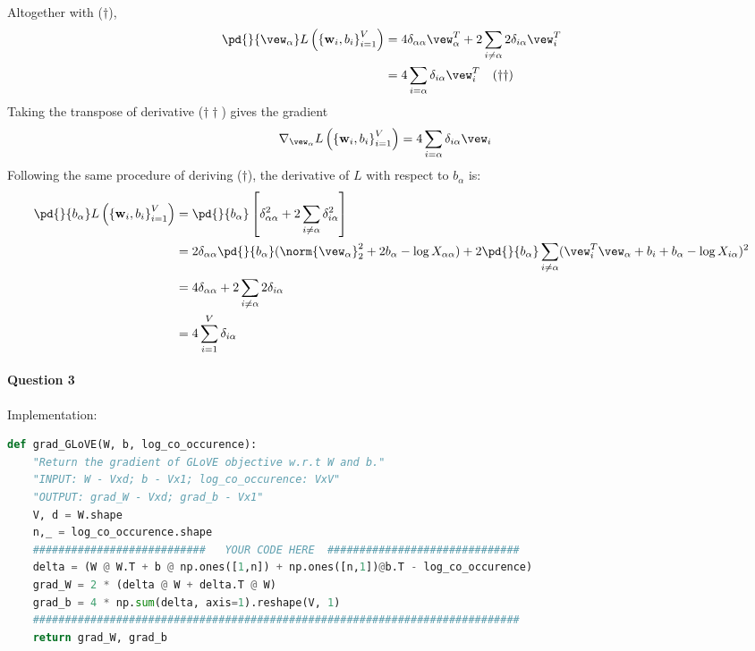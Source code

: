 \documentclass{article}
\begin{document}
    Altogether with ($\dagger$),
    \begin{align}
    	\pd{}{\vew_\alpha} L\left(\left\{\mathbf{w}_{i}, b_{i}\right\}_{i=1}^{V}\right)
    	&= 4 \delta_{\alpha \alpha} \vew_\alpha^T + 2 \sum_{i \neq \alpha} 2 \delta_{i \alpha} \vew_i^T \\
    	&= 4 \sum_{i=\alpha} \delta_{i\alpha} \vew_i^T \quad(\dagger \dagger)
    \end{align}
    Taking the transpose of derivative ($\dagger\dagger$) gives the gradient
    \begin{align}
    	\nabla_{\vew_\alpha} L\left(\left\{\mathbf{w}_{i}, b_{i}\right\}_{i=1}^{V}\right)
    	&= 4 \sum_{i=\alpha} \delta_{i\alpha} \vew_i
    \end{align}
    Following the same procedure of deriving ($\dagger$), the derivative of $L$ with respect to $b_\alpha$ is:
    \begin{align}
    	\pd{}{b_\alpha} L\left(\left\{\mathbf{w}_{i}, b_{i}\right\}_{i=1}^{V}\right)
    	&= \pd{}{b_\alpha}\left[ \delta_{\alpha \alpha}^2 
		+ 2 \sum_{i\neq\alpha} \delta_{i \alpha}^2
		\right] \\
		&= 2 \delta_{\alpha \alpha} \pd{}{b_\alpha} (\norm{\vew_\alpha}^2_2 + 2 b_\alpha - \log X_{\alpha \alpha})
		+ 2 \pd{}{b_\alpha} \sum_{i \neq \alpha} (\vew_i^T \vew_\alpha + b_i + b_\alpha - \log X_{i \alpha})^2 \\
		&= 4 \delta_{\alpha \alpha} + 2 \sum_{i \neq \alpha} 2 \delta_{i\alpha} \\
		&= 4 \sum_{i=1}^V \delta_{i \alpha}
    \end{align}
    
    \paragraph{Question 3} Implementation: 
    \begin{lstlisting}[language=python]
def grad_GLoVE(W, b, log_co_occurence):
    "Return the gradient of GLoVE objective w.r.t W and b."
    "INPUT: W - Vxd; b - Vx1; log_co_occurence: VxV"
    "OUTPUT: grad_W - Vxd; grad_b - Vx1"
    V, d = W.shape
    n,_ = log_co_occurence.shape
    ###########################   YOUR CODE HERE  ##############################
    delta = (W @ W.T + b @ np.ones([1,n]) + np.ones([n,1])@b.T - log_co_occurence)
    grad_W = 2 * (delta @ W + delta.T @ W)
    grad_b = 4 * np.sum(delta, axis=1).reshape(V, 1)
	############################################################################
    return grad_W, grad_b	
    \end{lstlisting}
    
\end{document}
